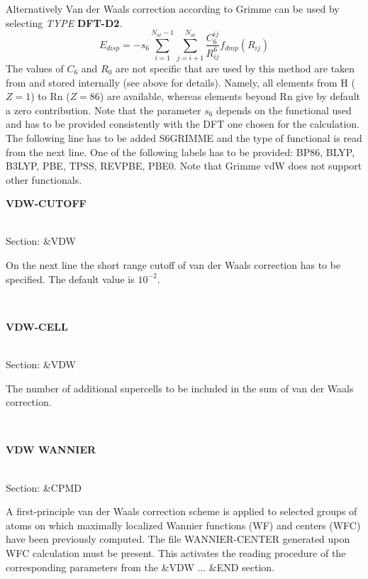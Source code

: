 \documentclass[twoside,10pt,titlepage,a4paper]{article}
\newcommand{\reflabel}[1]{\hypertarget{#1}}
\newcommand{\reflabel}[1]{\label{#1}}
\newcommand{\keyword}[5]{%
\vspace{1.0cm}
\begin{minipage}{15cm}
\reflabel{#1}{\textbf{\large #1}}%
\index{#1}%
\ \textbf{#2}%
\ \textbf{#3}%
\ \textit{#4}%
     \hfill\\\smallskip
     {Section: #5}
     \hfill\\\smallskip\vskip 10pt
\end{minipage}
}%
\newcommand{\desc}[1]{%
   \hspace*{\fill} \parbox{130mm}{\sloppy
                          {#1}%
                             }
     \hfill\\\smallskip
   }%
\newcommand{\desc}[1]{#1\vspace{1ex}}
\begin{document}
{Alternatively Van der Waals correction according to Grimme can be used \cite{Grimme06}
by selecting {\itshape TYPE} {\bf DFT-D2}. 
 \begin{equation}
  E_{disp} = - s_6 \sum_{i=1}^{N_{at} -1} \sum_{j=i+1}^{N_{at}} 
               \frac{C_6^{ij}}{R_{ij}^6} f_{dmp} (R_{ij})
 \end{equation}       
The values of $C_6$ and $R_0$ are not specific that are used by this method are taken 
from \cite{Grimme06} 
and stored internally (see above for details). Namely, all elements from H ($Z=1$) to
Rn ($Z=86$) are available, whereas elements beyond Rn give by default a zero contribution.
Note that the parameter $s_6$ depends on the functional used and has to be provided consistently
with the DFT one chosen for the calculation. The following line has to be added {S6GRIMME}
and the type of functional is read from the next line. One of the following labels has to be provided:
{BP86, BLYP, B3LYP, PBE, TPSS, REVPBE, PBE0}. Note that Grimme vdW does not support other functionals.
}


\keyword{VDW-CUTOFF}{}{}{}{\&VDW}
   \desc{On the next line the short range cutoff of van der Waals correction
    has to be specified. The default value is $10^{-2}$.}

\keyword{VDW-CELL}{}{}{}{\&VDW}
   \desc{The number of additional supercells to be included in the sum of
    van der Waals correction.}

\keyword{VDW WANNIER}{}{}{}{\&CPMD}
\desc{A first-principle van der Waals correction scheme \cite{psil1,psil2}
  is applied to selected groups of atoms on which maximally localized Wannier
  functions (WF) and centers (WFC) have been previously computed.
  The file WANNIER-CENTER generated upon WFC calculation must be present.
  This activates the reading procedure of the corresponding parameters from
  the \&VDW ... \&END section.}
\end{document}
